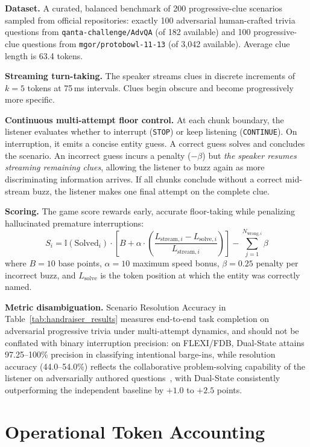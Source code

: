 \documentclass{article}
\begin{document}
\textbf{Dataset.} A curated, balanced benchmark of 200 progressive-clue scenarios sampled from official repositories: exactly 100 adversarial human-crafted trivia questions from \texttt{qanta-challenge/AdvQA} (of 182 available) and 100 progressive-clue questions from \texttt{mgor/protobowl-11-13} (of 3{,}042 available). Average clue length is 63.4 tokens.

\textbf{Streaming turn-taking.} The speaker streams clues in discrete increments of $k=5$ tokens at 75\,ms intervals. Clues begin obscure and become progressively more specific.

\textbf{Continuous multi-attempt floor control.} At each chunk boundary, the listener evaluates whether to interrupt (\texttt{STOP}) or keep listening (\texttt{CONTINUE}). On interruption, it emits a concise entity guess. A correct guess solves and concludes the scenario. An incorrect guess incurs a penalty ($-\beta$) but \emph{the speaker resumes streaming remaining clues}, allowing the listener to buzz again as more discriminating information arrives. If all chunks conclude without a correct mid-stream buzz, the listener makes one final attempt on the complete clue.

\textbf{Scoring.} The game score rewards early, accurate floor-taking while penalizing hallucinated premature interruptions:
\begin{equation}
S_i = \mathbb{I}(\text{Solved}_i) \cdot \left[ B + \alpha \cdot \left(\frac{L_{\text{stream}, i} - L_{\text{solve}, i}}{L_{\text{stream}, i}}\right) \right] - \sum_{j=1}^{N_{\text{wrong}, i}} \beta
\label{eq:game_score}
\end{equation}
where $B = 10$ base points, $\alpha = 10$ maximum speed bonus, $\beta = 0.25$ penalty per incorrect buzz, and $L_{\text{solve}}$ is the token position at which the entity was correctly named.

\textbf{Metric disambiguation.} Scenario Resolution Accuracy in Table~\ref{tab:handraiser_results} measures end-to-end task completion on adversarial progressive trivia under multi-attempt dynamics, and should not be conflated with binary interruption precision: on FLEXI/FDB, Dual-State attains 97.25--100\% precision in classifying intentional barge-ins, while resolution accuracy (44.0--54.0\%) reflects the collaborative problem-solving capability of the listener on adversarially authored questions~\citep{wallace2019trick}, with Dual-State consistently outperforming the independent baseline by $+1.0$ to $+2.5$ points.

\section{Operational Token Accounting}
\label{app:tokens}
\end{document}
